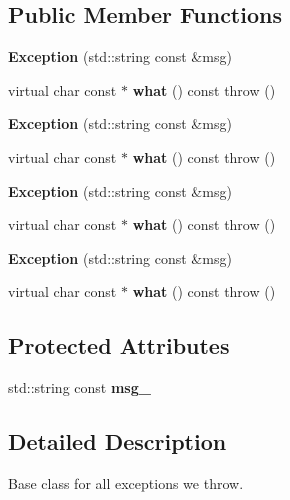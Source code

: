 \subsection*{Public Member Functions}
\begin{DoxyCompactItemize}
\item 
{\bfseries Exception} (std\+::string const \&msg)\label{class_json_1_1_exception_a4dd1b9f007bed842e3ef9883d965fe22}

\item 
virtual char const $\ast$ {\bfseries what} () const   throw ()\label{class_json_1_1_exception_a93032b715e86fc37ad318c60eac4cad7}

\item 
{\bfseries Exception} (std\+::string const \&msg)\label{class_json_1_1_exception_a4dd1b9f007bed842e3ef9883d965fe22}

\item 
virtual char const $\ast$ {\bfseries what} () const   throw ()\label{class_json_1_1_exception_a49708f583127d4190f9e3806ac8e8eff}

\item 
{\bfseries Exception} (std\+::string const \&msg)\label{class_json_1_1_exception_a4dd1b9f007bed842e3ef9883d965fe22}

\item 
virtual char const $\ast$ {\bfseries what} () const   throw ()\label{class_json_1_1_exception_a49708f583127d4190f9e3806ac8e8eff}

\item 
{\bfseries Exception} (std\+::string const \&msg)\label{class_json_1_1_exception_a4dd1b9f007bed842e3ef9883d965fe22}

\item 
virtual char const $\ast$ {\bfseries what} () const   throw ()\label{class_json_1_1_exception_a49708f583127d4190f9e3806ac8e8eff}

\end{DoxyCompactItemize}
\subsection*{Protected Attributes}
\begin{DoxyCompactItemize}
\item 
std\+::string const {\bfseries msg\+\_\+}\label{class_json_1_1_exception_a6457bfa979e1bba636ba34605203f6a0}

\end{DoxyCompactItemize}


\subsection{Detailed Description}
Base class for all exceptions we throw.

